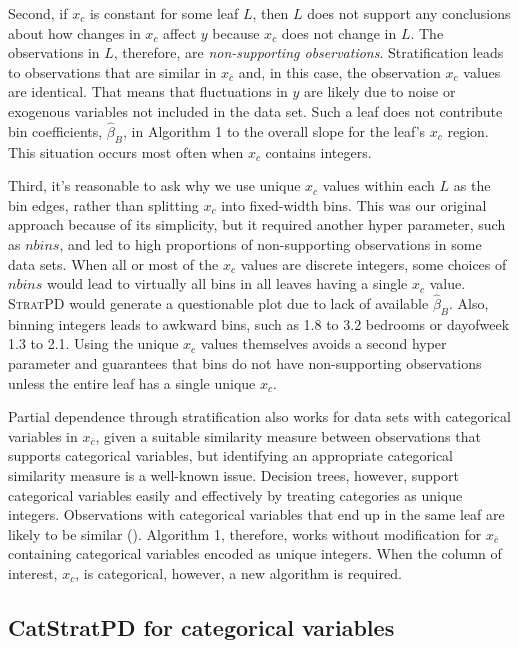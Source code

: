 \documentclass[12pt]{article}
\newcommand{\spd}{\fontfamily{cmr}\textsc{\small StratPD}}
\newcommand{\xnc}{$x_{\overline{c}}$}
\begin{document}
Second, if $x_c$ is constant for some leaf $L$, then $L$ does not support any conclusions about how changes in $x_c$ affect $y$ because $x_c$ does not change in $L$.  The observations in $L$, therefore, are {\it non-supporting observations}. Stratification leads to observations that are similar in \xnc{} and, in this case, the observation $x_c$ values are identical. That means that fluctuations in $y$ are likely due to noise or exogenous variables not included in the data set. Such a leaf does not contribute bin coefficients, $\hat{\beta}_B$, in Algorithm 1 to the overall slope for the leaf's $x_c$ region. This situation occurs most often when $x_c$ contains integers.

Third, it's reasonable to ask why we use unique $x_c$ values within each $L$ as the bin edges, rather than splitting $x_c$ into fixed-width bins.  This was our original approach because of its simplicity, but it required another hyper parameter, such as $nbins$, and led to high proportions of non-supporting observations in some data sets. When all or most of the $x_c$ values are discrete integers, some choices of $nbins$ would lead to virtually all bins in all leaves having a single $x_c$ value. \spd{} would generate a questionable plot due to lack of available $\hat{\beta}_B$. Also, binning integers leads to awkward bins, such as 1.8 to 3.2 bedrooms or dayofweek 1.3 to 2.1.  Using the unique $x_c$ values themselves avoids a second hyper parameter and guarantees that bins do not have non-supporting observations unless the entire leaf has a single unique $x_c$.

Partial dependence through stratification also works for data sets with categorical variables in \xnc{}, given a suitable similarity measure between observations that supports categorical variables, but identifying an appropriate categorical similarity measure is a well-known issue.  Decision trees, however, support categorical variables easily and effectively by treating categories as unique integers. Observations with categorical variables that end up in the same leaf are likely to be similar (\cite{RFunsup}). Algorithm 1, therefore, works without modification for \xnc{} containing categorical variables encoded as unique integers. When the column of interest, $x_c$, is categorical, however, a new algorithm is required.

\subsection{CatStratPD for categorical variables}\label{sec:catstrat}
\end{document}
